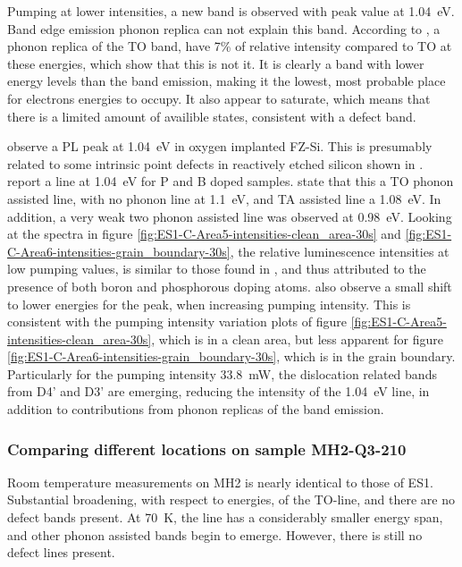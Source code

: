 Pumping at lower intensities, a new band is observed with peak value at 1.04~eV. Band edge emission phonon replica can not explain this band. According to \cite{dean67}, a phonon replica of the TO band, have 7\% of relative intensity compared to TO at these energies, which show that this is not it. It is clearly a band with lower energy levels than the band emission, making it the lowest, most probable place for electrons energies to occupy. It also appear to saturate, which means that there is a limited amount of availible states, consistent with a defect band.

\cite{misiuk99} observe a PL peak at 1.04~eV in oxygen implanted FZ-Si. This is presumably related to some intrinsic point defects in reactively etched silicon shown in \cite{erzgraber96}. \cite{enck69} report a line at 1.04~eV for P and B doped samples. \cite{enck69} state that this a TO phonon assisted line, with no phonon line at 1.1~eV, and TA assisted line a 1.08~eV. In addition, a very weak two phonon assisted line was observed at 0.98~eV. Looking at the spectra in figure \ref{fig:ES1-C-Area5-intensities-clean_area-30s} and \ref{fig:ES1-C-Area6-intensities-grain_boundary-30s}, the relative luminescence intensities at low pumping values, is similar to those found in \cite{enck69}, and thus attributed to the presence of both boron and phosphorous doping atoms. \cite{enck69} also observe a small shift to lower energies for the peak, when increasing pumping intensity. This is consistent with the pumping intensity variation plots of figure \ref{fig:ES1-C-Area5-intensities-clean_area-30s}, which is in a clean area, but less apparent for figure \ref{fig:ES1-C-Area6-intensities-grain_boundary-30s}, which is in the grain boundary. Particularly for the pumping intensity 33.8~mW, the dislocation related bands from D4' and D3' are emerging, reducing the intensity of the 1.04~eV line, in addition to contributions from phonon replicas of the band emission.





\subsubsection{Comparing different locations on sample MH2-Q3-210}

Room temperature measurements on MH2 is nearly identical to those of ES1. Substantial broadening, with respect to energies, of the TO-line, and there are no defect bands present. At 70~K, the line has a considerably smaller energy span, and other phonon assisted bands begin to emerge. However, there is still no defect lines present.

